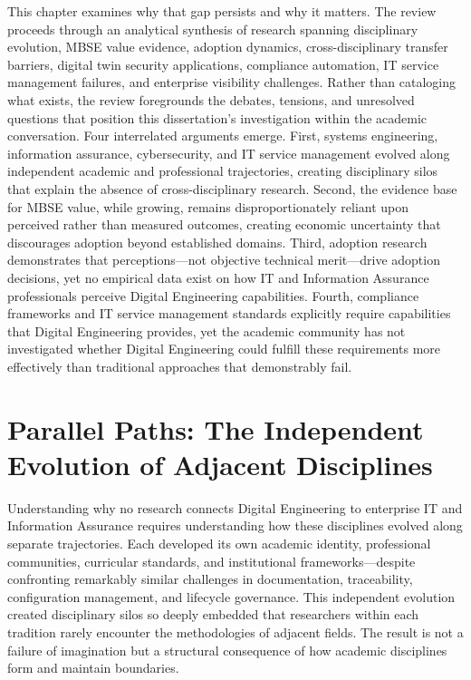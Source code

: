 This chapter examines why that gap persists and why it matters. The review proceeds through an analytical synthesis of research spanning disciplinary evolution, MBSE value evidence, adoption dynamics, cross-disciplinary transfer barriers, digital twin security applications, compliance automation, IT service management failures, and enterprise visibility challenges. Rather than cataloging what exists, the review foregrounds the debates, tensions, and unresolved questions that position this dissertation's investigation within the academic conversation. Four interrelated arguments emerge. First, systems engineering, information assurance, cybersecurity, and IT service management evolved along independent academic and professional trajectories, creating disciplinary silos that explain the absence of cross-disciplinary research. Second, the evidence base for MBSE value, while growing, remains disproportionately reliant upon perceived rather than measured outcomes, creating economic uncertainty that discourages adoption beyond established domains. Third, adoption research demonstrates that perceptions---not objective technical merit---drive adoption decisions, yet no empirical data exist on how IT and Information Assurance professionals perceive Digital Engineering capabilities. Fourth, compliance frameworks and IT service management standards explicitly require capabilities that Digital Engineering provides, yet the academic community has not investigated whether Digital Engineering could fulfill these requirements more effectively than traditional approaches that demonstrably fail.

\section{Parallel Paths: The Independent Evolution of Adjacent Disciplines}

Understanding why no research connects Digital Engineering to enterprise IT and Information Assurance requires understanding how these disciplines evolved along separate trajectories. Each developed its own academic identity, professional communities, curricular standards, and institutional frameworks---despite confronting remarkably similar challenges in documentation, traceability, configuration management, and lifecycle governance. This independent evolution created disciplinary silos so deeply embedded that researchers within each tradition rarely encounter the methodologies of adjacent fields. The result is not a failure of imagination but a structural consequence of how academic disciplines form and maintain boundaries.

